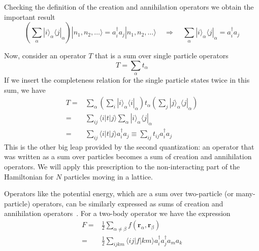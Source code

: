\documentclass[oneside,11pt]{memoir}
\newcommand{\bv}[1]{\ensuremath{\bm{#1}}}
\begin{document}
Checking the definition of the creation and annihilation operators we obtain
the important result 
\begin{equation}
  \left(
   \sum_{\alpha} |i\rangle_{\alpha} \langle j | _{\alpha}  \right)
  | n_{1},  n_{2}, \ldots \rangle 
   =   a_{i}^{\dagger} a_{j} 
  | n_{1},  n_{2}, \ldots \rangle 
  ~~~~~ \Rightarrow ~~~~~ 
   \sum_{\alpha} |i\rangle_{\alpha} \langle j | _{\alpha} = 
     a_{i}^{\dagger} a_{j} 
\end{equation}

Now, consider an operator $T$ that is a sum over single particle operators
\begin{equation}
  T = \sum_{\alpha} t_{\alpha}
 \label{eq:defsingleparticleop}
\end{equation}  
If we insert the completeness relation for the single particle states twice in
this sum, we have \begin{equation}
\begin{split}
  T = & \sum_{\alpha} \left( \sum_{i} |i\rangle_{\alpha}\langle i |_{\alpha} \right)
        t_{\alpha} \left( \sum_{j} |j\rangle_{\alpha}\langle j |_{\alpha} \right) \\
    = & \sum_{ij}   \langle i | t | j \rangle  \sum_{\alpha} |i\rangle_{\alpha} \langle j |_{\alpha} \\ 
    = & \sum_{ij}   \langle i | t | j \rangle a_{i}^{\dagger} a_{j} \equiv \sum_{ij} t_{ij}   a_{i}^{\dagger} a_{j} 
\end{split}  
\end{equation}
This is the other big leap provided by the second quantization:  an operator
that was written as a sum over particles becomes a sum of creation and
annihilation operators.   We will apply this prescription to the
non-interacting part of the Hamiltonian for $N$ particles moving in a lattice.  

Operators like the potential energy, which are a sum over two-particle (or
many-particle) operators,  can be similarly expressed as sums of creation and
annihilation operators~\cite{schwabl2005advanced}.  For a two-body operator we
have the expression
\begin{equation}
\begin{split}
F = & \frac{1}{2} \sum_{\alpha\neq\beta} f(\bv{r}_{\alpha}, \bv{r}_{\beta} )  \\
  = & \frac{1}{2} \sum_{ijkm} \langle ij | f | km \rangle 
        a_{i}^{\dagger} a_{j}^{\dagger} a_{m} a_{k} 
\end{split}
\end{equation}
\end{document}
